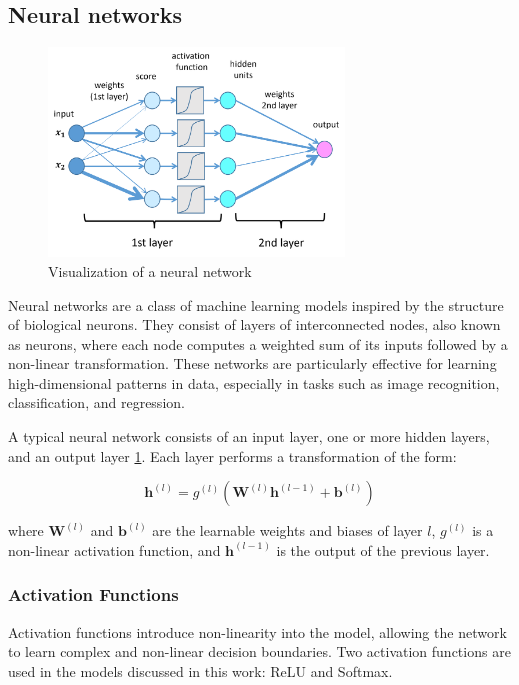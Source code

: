 \documentclass{pracalicmgr}
\begin{document}
\subsection{Neural networks}

\begin{figure}[H]
\centering
\includegraphics[width=0.7\textwidth]{src/deepNet.png}
\caption{Visualization of a neural network}
\label{fig:deepN}
\end{figure}

Neural networks are a class of machine learning models inspired by the structure of biological neurons. They consist of layers of interconnected nodes, also known as neurons, where each node computes a weighted sum of its inputs followed by a non-linear transformation. These networks are particularly effective for learning high-dimensional patterns in data, especially in tasks such as image recognition, classification, and regression.

A typical neural network consists of an input layer, one or more hidden layers, and an output layer \ref{fig:deepN}. Each layer performs a transformation of the form:

\[
\mathbf{h}^{(l)} = g^{(l)}(\mathbf{W}^{(l)} \mathbf{h}^{(l-1)} + \mathbf{b}^{(l)})
\]

where \( \mathbf{W}^{(l)} \) and \( \mathbf{b}^{(l)} \) are the learnable weights and biases of layer \( l \), \( g^{(l)} \) is a non-linear activation function, and \( \mathbf{h}^{(l-1)} \) is the output of the previous layer.

\subsubsection{Activation Functions}

Activation functions introduce non-linearity into the model, allowing the network to learn complex and non-linear decision boundaries. Two activation functions are used in the models discussed in this work: ReLU and Softmax.
\end{document}
